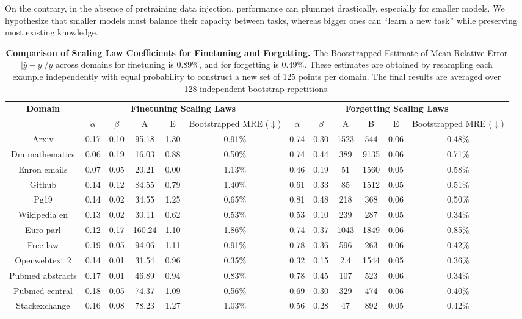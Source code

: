 On the contrary, in the absence of pretraining data injection, performance can plummet drastically, especially for smaller models. We hypothesize that smaller models must balance their capacity between tasks, whereas bigger ones can ``learn a new task'' while preserving most existing knowledge.  

\begin{table*}[t!]
    \centering
    \begin{tabular}{c|ccccc|cccccc}
        \textbf{Domain} & \multicolumn{5}{c|}{\textbf{Finetuning Scaling Laws}} & \multicolumn{6}{c}{\textbf{Forgetting Scaling Laws}} \\
        & $\alpha$ & $\beta$ & A & E & \makecell{Bootstrapped\\ MRE ($\downarrow$)} & $\alpha$ & $\beta$ & A & B & E & \makecell{Bootstrapped\\ MRE ($\downarrow$)} \\
        \toprule
        Arxiv & 0.17 & 0.10 & 95.18 & 1.30 & 0.91\% & 0.74 & 0.30 & 1523 & 544 & 0.06 & 0.48\% \\
        Dm mathematics & 0.06 & 0.19 & 16.03 & 0.88 & 0.50\% & 0.74 & 0.44 & 389 & 9135 & 0.06 & 0.71\% \\
        Enron emails & 0.07 & 0.05 & 20.21 & 0.00 & 1.13\% & 0.46 & 0.19 & 51 & 1560 & 0.05 & 0.58\% \\
        Github & 0.14 & 0.12 & 84.55 & 0.79 & 1.40\% & 0.61 & 0.33 & 85 & 1512 & 0.05 & 0.51\% \\
        Pg19 & 0.14 & 0.02 & 34.55 & 1.25 & 0.65\% & 0.81 & 0.48 & 218 & 368 & 0.06 & 0.50\% \\
        Wikipedia en & 0.13 & 0.02 & 30.11 & 0.62 & 0.53\% & 0.53 & 0.10 & 239 & 287 & 0.05 & 0.34\% \\
        Euro parl & 0.12 & 0.17 & 160.24 & 1.10 & 1.86\% & 0.74 & 0.37 & 1043 & 1849 & 0.06 & 0.85\% \\
        Free law & 0.19 & 0.05 & 94.06 & 1.11 & 0.91\% & 0.78 & 0.36 & 596 & 263 & 0.06 & 0.42\% \\
        Openwebtext 2 & 0.14 & 0.01 & 31.54 & 0.96 & 0.35\% & 0.32 & 0.15 & 2.4 & 1544 & 0.05 & 0.36\% \\
        Pubmed abstracts & 0.17 & 0.01 & 46.89 & 0.94 & 0.83\% & 0.78 & 0.45 & 107 & 523 & 0.06 & 0.34\% \\
        Pubmed central & 0.18 & 0.05 & 74.37 & 1.09 & 0.56\% & 0.69 & 0.30 & 329 & 474 & 0.06 & 0.40\% \\
        Stackexchange & 0.16 & 0.08 & 78.23 & 1.27 & 1.03\% & 0.56 & 0.28 & 47 & 892 & 0.05 & 0.42\% \\
    \end{tabular}
    \caption{\textbf{Comparison of Scaling Law Coefficients for Finetuning and Forgetting.} The Bootstrapped Estimate of Mean Relative Error $|\hat y - y|/y$ across domains for finetuning is $\bm{0.89\%}$, and for forgetting is $\bm{0.49\%}$. These estimates are obtained by resampling each example independently with equal probability to construct a new set of 125 points per domain. The final results are averaged over 128 independent bootstrap repetitions.}
    \label{tab:scaling_laws_comparison}
\end{table*}



